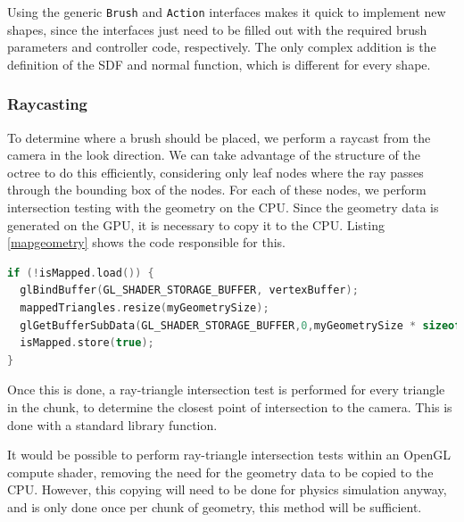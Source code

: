 \documentclass[11pt]{article}
\begin{document}
Using the generic \texttt{Brush} and \texttt{Action} interfaces makes it quick to implement new shapes, since the interfaces just need to be filled out with the required brush parameters and controller code, respectively. The only complex addition is the definition of the SDF and normal function, which is different for every shape.

\subsubsection{Raycasting}
\label{section:raycasting}
To determine where a brush should be placed, we perform a raycast from the camera in the look direction. We can take advantage of the structure of the octree to do this efficiently, considering only leaf nodes where the ray passes through the bounding box of the nodes. For each of these nodes, we perform intersection testing with the geometry on the CPU. Since the geometry data is generated on the GPU, it is necessary to copy it to the CPU. Listing \ref{mapgeometry} shows the code responsible for this.

\begin{lstlisting}[language=C++,label={mapgeometry},caption={Snippet from the procedure \texttt{mapGeometry} to copy geometry data for a chunk from the GPU to the array \texttt{mappedTriangles}. \texttt{isMapped} is an atomic boolean storing whether \texttt{mapGeometry} has already been called for this chunk.}]
if (!isMapped.load()) {
  glBindBuffer(GL_SHADER_STORAGE_BUFFER, vertexBuffer);
  mappedTriangles.resize(myGeometrySize);
  glGetBufferSubData(GL_SHADER_STORAGE_BUFFER,0,myGeometrySize * sizeof(glm::vec4),mappedTriangles.data());
  isMapped.store(true);
}
\end{lstlisting}

Once this is done, a ray-triangle intersection test is performed for every triangle in the chunk, to determine the closest point of intersection to the camera. This is done with a standard library function. 

It would be possible to perform ray-triangle intersection tests within an OpenGL compute shader, removing the need for the geometry data to be copied to the CPU. However, this copying will need to be done for physics simulation anyway, and is only done once per chunk of geometry, this method will be sufficient.
\end{document}
